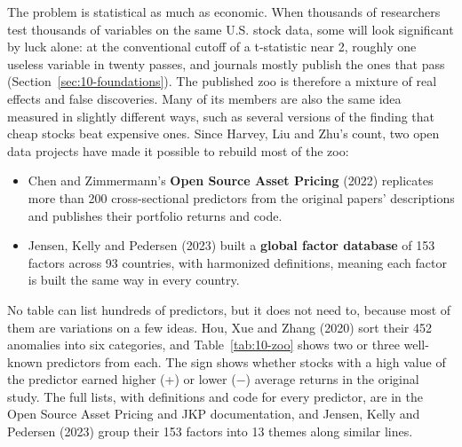 The problem is statistical as much as economic. When thousands of researchers test thousands of variables on the same U.S. stock data, some will look significant by luck alone: at the conventional cutoff of a t-statistic near 2, roughly one useless variable in twenty passes, and journals mostly publish the ones that pass (Section~\ref{sec:10-foundations}). The published zoo is therefore a mixture of real effects and false discoveries. Many of its members are also the same idea measured in slightly different ways, such as several versions of the finding that cheap stocks beat expensive ones. Since Harvey, Liu and Zhu's count, two open data projects have made it possible to rebuild most of the zoo:

\begin{itemize}
  \item Chen and Zimmermann's \textbf{Open Source Asset Pricing} (2022) replicates more than 200 cross-sectional predictors from the original papers' descriptions and publishes their portfolio returns and code.
  \item Jensen, Kelly and Pedersen (2023) built a \textbf{global factor database} of 153 factors across 93 countries, with harmonized definitions, meaning each factor is built the same way in every country.
\end{itemize}

No table can list hundreds of predictors, but it does not need to, because most of them are variations on a few ideas. Hou, Xue and Zhang (2020) sort their 452 anomalies into six categories, and Table~\ref{tab:10-zoo} shows two or three well-known predictors from each. The sign shows whether stocks with a high value of the predictor earned higher (+) or lower ($-$) average returns in the original study. The full lists, with definitions and code for every predictor, are in the Open Source Asset Pricing and JKP documentation, and Jensen, Kelly and Pedersen (2023) group their 153 factors into 13 themes along similar lines.


